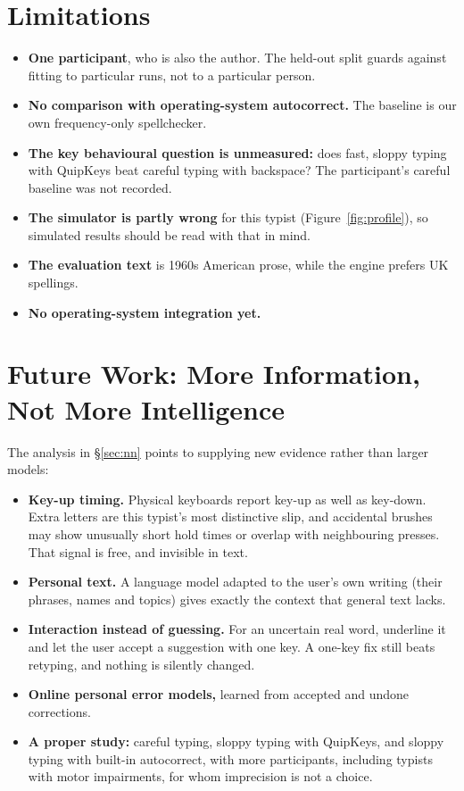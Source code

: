 \documentclass[11pt,a4paper]{article}
\newcommand{\qk}{QuipKeys}
\begin{document}
\section{Limitations}
\label{sec:limits}
\begin{itemize}
\item \textbf{One participant}, who is also the author. The held-out split guards against fitting to particular runs, not to a particular person.
\item \textbf{No comparison with operating-system autocorrect.} The baseline is our own frequency-only spellchecker.
\item \textbf{The key behavioural question is unmeasured:} does fast, sloppy typing with \qk{} beat careful typing with backspace? The participant's careful baseline was not recorded.
\item \textbf{The simulator is partly wrong} for this typist (Figure~\ref{fig:profile}), so simulated results should be read with that in mind.
\item \textbf{The evaluation text} is 1960s American prose, while the engine prefers UK spellings.
\item \textbf{No operating-system integration yet.}
\end{itemize}

\section{Future Work: More Information, Not More Intelligence}
\label{sec:future}
The analysis in \S\ref{sec:nn} points to supplying new evidence rather than larger models:
\begin{itemize}
\item \textbf{Key-up timing.} Physical keyboards report key-up as well as key-down. Extra letters are this typist's most distinctive slip, and accidental brushes may show unusually short hold times or overlap with neighbouring presses. That signal is free, and invisible in text.
\item \textbf{Personal text.} A language model adapted to the user's own writing (their phrases, names and topics) gives exactly the context that general text lacks.
\item \textbf{Interaction instead of guessing.} For an uncertain real word, underline it and let the user accept a suggestion with one key. A one-key fix still beats retyping, and nothing is silently changed.
\item \textbf{Online personal error models,} learned from accepted and undone corrections.
\item \textbf{A proper study:} careful typing, sloppy typing with \qk{}, and sloppy typing with built-in autocorrect, with more participants, including typists with motor impairments, for whom imprecision is not a choice.
\end{itemize}
\end{document}
